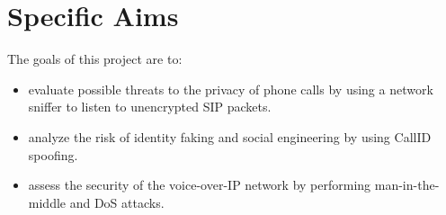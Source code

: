 \section{Specific Aims}
\label{sec:aim}

The goals of this project are to:

\begin{itemize}
\item evaluate possible threats to the privacy of phone calls by using a network sniffer to listen to unencrypted SIP packets.
\item analyze the risk of identity faking and social engineering by using CallID spoofing.
\item assess the security of the voice-over-IP network by performing man-in-the-middle and DoS attacks.
\end{itemize}